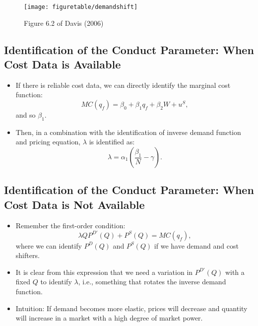 \documentclass[
]{book}
\providecommand{\tightlist}{%
  \setlength{\itemsep}{0pt}\setlength{\parskip}{0pt}}
\begin{document}
\begin{figure}

{\centering \texttt{[image: figuretable/demandshift]} 

}

\caption{Figure 6.2 of Davis (2006)}\label{fig:unnamed-chunk-4}
\end{figure}

\hypertarget{identification-of-the-conduct-parameter-when-cost-data-is-available}{%
\subsection{Identification of the Conduct Parameter: When Cost Data is Available}\label{identification-of-the-conduct-parameter-when-cost-data-is-available}}

\begin{itemize}
\tightlist
\item
  If there is reliable cost data, we can directly identify the marginal cost function:
  \begin{equation}
  MC(q_f) = \beta_0 + \beta_1 q_f + \beta_2 W + u^S,
  \end{equation}
  and so \(\beta_1\).
\item
  Then, in a combination with the identification of inverse demand function and pricing equation, \(\lambda\) is identified as:
  \begin{equation}
  \lambda = \alpha_1 \left(\frac{\beta_1}{N} - \gamma\right).
  \end{equation}
\end{itemize}

\hypertarget{identification-of-the-conduct-parameter-when-cost-data-is-not-available}{%
\subsection{Identification of the Conduct Parameter: When Cost Data is Not Available}\label{identification-of-the-conduct-parameter-when-cost-data-is-not-available}}

\begin{itemize}
\tightlist
\item
  Remember the first-order condition:
  \begin{equation}
  \lambda Q P^{D\prime}(Q) + P^S(Q) = MC(q_f),
  \end{equation}
  where we can identify \(P^D(Q)\) and \(P^S(Q)\) if we have demand and cost shifters.
\item
  It is clear from this expression that we need a variation in \(P^{D\prime}(Q)\) with a fixed \(Q\) to identify \(\lambda\), i.e., something that rotates the inverse demand function.
\item
  Intuition: If demand becomes more elastic, prices will decrease and quantity will increase in a market with a high degree of market power.
\end{itemize}
\end{document}

